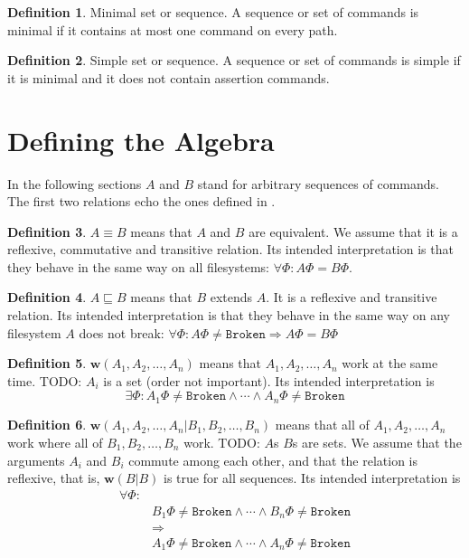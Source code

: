 \documentclass[12pt]{article}
\newcommand{\fsbroken}{\mathtt{Broken}} %
\newcommand{\FS}{\Phi} %
\newcommand{\eqext}{\sqsubseteq}
\newcommand{\works}[1]{{\mathbf{w}}({#1})}
\newcommand{\worksc}[2]{{\mathbf{w}}({#1}|{#2})}
\theoremstyle{definition}
\newtheorem{mydef}{Definition}
\begin{document}
\begin{mydef}{Minimal set or sequence.}
A sequence or set of commands is minimal if it contains at most one command on every path.
\end{mydef}

\begin{mydef}{Simple set or sequence.}
A sequence or set of commands is simple if it is minimal and it does not contain assertion commands.
\end{mydef}

\section{Defining the Algebra}

In the following sections $A$ and $B$ stand for arbitrary sequences of commands.
The first two relations echo the ones defined in \cite{NREC:alg}.

\begin{mydef}
$A\equiv B$ means that $A$ and $B$ are equivalent.
We assume that it is a reflexive, commutative and transitive relation.
Its intended interpretation is that they behave in the same way on
all filesystems: $\forall \FS: A\FS=B\FS$.
\end{mydef}

\begin{mydef}
$A\eqext B$ means that $B$ extends $A$.
It is a reflexive and transitive relation.
Its intended interpretation is that they behave in the same way
on any filesystem $A$ does not break:
$\forall \FS: A\FS\neq\fsbroken\Rightarrow A\FS=B\FS$
\end{mydef}

\begin{mydef}
$\works{A_1,A_2,\ldots,A_n}$ means that 
$A_1,A_2,\ldots,A_n$ work at the same time.
TODO: $A_i$ is a set (order not important).
Its intended interpretation is
\[\exists \FS: A_1\FS\neq\fsbroken \wedge \cdots \wedge A_n\FS\neq\fsbroken\]
\end{mydef}

\begin{mydef}
$\worksc{A_1,A_2,\ldots,A_n}{B_1,B_2,\ldots,B_n}$ means that 
all of $A_1,A_2,\ldots,A_n$ work where all of $B_1,B_2,\ldots,B_n$ work.
TODO: $A$s $B$s are sets.
We assume that the arguments $A_i$ and $B_i$ commute among each other,
and that the relation is reflexive, that is, $\worksc{B}{B}$ is true for all sequences.
Its intended interpretation is
\begin{align*}
\forall \FS:&\\ 
&B_1\FS\neq\fsbroken \wedge \cdots \wedge B_n\FS\neq\fsbroken\\
&\Rightarrow\\
&A_1\FS\neq\fsbroken \wedge \cdots \wedge A_n\FS\neq\fsbroken
\end{align*}
\end{mydef}
\end{document}
